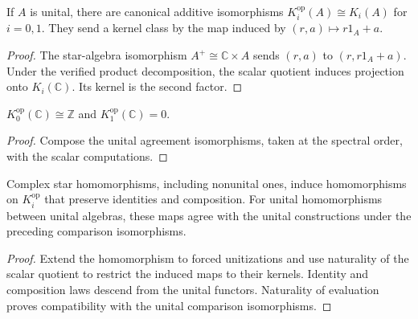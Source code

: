 \begin{proposition}\label{prop:operator-k-unital-agreement}
If $A$ is unital, there are canonical additive isomorphisms
$K_i^{\mathrm{op}}(A)\cong K_i(A)$ for $i=0,1$.
They send a kernel class by the map induced by $(r,a)\mapsto r1_A+a$.
\end{proposition}
\begin{proof}
\leanok
The star-algebra isomorphism $A^+\cong\mathbb C\times A$ sends $(r,a)$ to
$(r,r1_A+a)$. Under the verified product decomposition, the scalar quotient
induces projection onto $K_i(\mathbb C)$. Its kernel is the second factor.
\end{proof}

\begin{corollary}\label{cor:scalar-operator-k-nonunital}
\leanok
$K_0^{\mathrm{op}}(\mathbb C)\cong\mathbb Z$ and $K_1^{\mathrm{op}}(\mathbb C)=0$.
\end{corollary}
\begin{proof}
\leanok
Compose the unital agreement isomorphisms, taken at the spectral order, with
the scalar computations.
\end{proof}

\begin{proposition}\label{prop:operator-k-functoriality}
Complex star homomorphisms, including nonunital ones, induce homomorphisms
on $K_i^{\mathrm{op}}$ that preserve identities and composition.
For unital homomorphisms between unital algebras, these maps agree with the
unital constructions under the preceding comparison isomorphisms.
\end{proposition}
\begin{proof}
\leanok
Extend the homomorphism to forced unitizations and use naturality of the
scalar quotient to restrict the induced maps to their kernels. Identity and
composition laws descend from the unital functors. Naturality of evaluation
proves compatibility with the unital comparison isomorphisms.
\end{proof}

